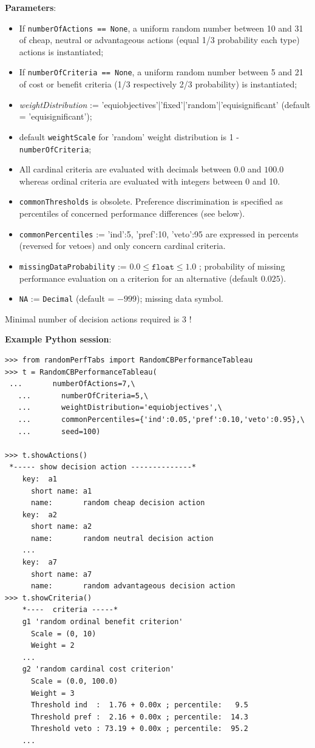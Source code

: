 \textbf{Parameters}:
\begin{itemize}
\item If \texttt{numberOfActions == None}, a uniform random number between 10 and 31 of cheap, neutral or advantageous actions (equal 1/3 probability each type) actions is instantiated;
\item If \texttt{numberOfCriteria == None}, a uniform random number between 5 and 21 of cost or benefit criteria (1/3 respectively 2/3 probability) is instantiated;
\item \emph{weightDistribution} := {'equiobjectives'|'fixed'|'random'|'equisignificant' (default = 'equisignificant')};
\item default \texttt{weightScale} for 'random' weight distribution is 1 - \texttt{numberOfCriteria};
\item All cardinal criteria are evaluated with decimals between $0.0$ and $100.0$ whereas ordinal criteria are evaluated with integers between 0 and 10.
\item \texttt{commonThresholds} is obsolete. Preference discrimination is specified as percentiles of concerned performance differences (see below).
\item \texttt{commonPercentiles} := {'ind':5, 'pref':10, 'veto':95} are expressed in percents (reversed for vetoes) and only concern cardinal criteria.
\item \texttt{missingDataProbability} := $0.0 \leq \mathtt{float} \leq 1.0$ ; probability of missing performance evaluation on a criterion for an alternative (default $0.025$).
\item \texttt{NA} := \texttt{Decimal} (default = $-999$); missing data symbol. 
\end{itemize}

Minimal number of decision actions required is 3 ! 

\noindent \textbf{Example Python session}:

\begin{lstlisting}[caption={Generating a random Cost-Benefit performance tableau},label=list:5.2]
>>> from randomPerfTabs import RandomCBPerformanceTableau
>>> t = RandomCBPerformanceTableau(
 ...       numberOfActions=7,\
   ...       numberOfCriteria=5,\
   ...       weightDistribution='equiobjectives',\
   ...       commonPercentiles={'ind':0.05,'pref':0.10,'veto':0.95},\
   ...       seed=100)

>>> t.showActions()
 *----- show decision action --------------*
    key:  a1
      short name: a1
      name:       random cheap decision action
    key:  a2
      short name: a2
      name:       random neutral decision action
    ...
    key:  a7
      short name: a7
      name:       random advantageous decision action
>>> t.showCriteria()
    *----  criteria -----*
    g1 'random ordinal benefit criterion'
      Scale = (0, 10)
      Weight = 2
    ...
    g2 'random cardinal cost criterion'
      Scale = (0.0, 100.0)
      Weight = 3 
      Threshold ind  :  1.76 + 0.00x ; percentile:   9.5
      Threshold pref :  2.16 + 0.00x ; percentile:  14.3
      Threshold veto : 73.19 + 0.00x ; percentile:  95.2
    ...
 \end{lstlisting}

